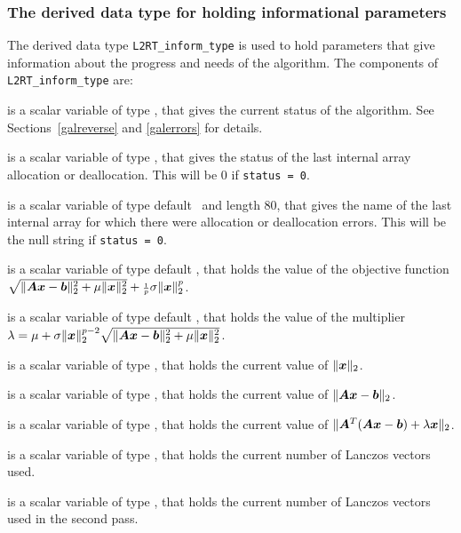 \documentclass{galahad}
\newcommand{\packagename}{L2\-RT}
\begin{document}

\subsubsection{The derived data type for holding informational
 parameters}\label{typeinform}
The derived data type
{\tt \packagename\_inform\_type}
is used to hold parameters that give information about the progress and needs
of the algorithm. The components of
{\tt \packagename\_inform\_type}
are:

\begin{description}
 is a scalar variable of type \integer, that gives the
current status of the algorithm. See Sections~\ref{galreverse} and
\ref{galerrors} for details.

 is a scalar variable of type \integer,
that gives the status of the last internal array allocation
or deallocation. This will be 0 if {\tt status = 0}.

 is a scalar variable of type default \character\
and length 80, that  gives the name of the last internal array
for which there were allocation or deallocation errors.
This will be the null string if {\tt status = 0}.

 is a scalar variable of type default
\realdp, that holds the value of the objective function
$\sqrt{\| {\bm{A}} {\bm{x}} - {\bm{b}}\|_2^2 + \mu \| {\bm{x}} \|_2^2}
 + {\scriptstyle \frac{1}{p}} \sigma \| {\bm{x}} \|_2^p$.

 is a scalar variable of type default
\realdp, that holds the value of the multiplier
$\lambda = \mu + \sigma \|{\bm{x}}\|_2^{p-2}
 \sqrt{\| {\bm{A}} {\bm{x}} - {\bm{b}} \|_2^2 + \mu \|{\bm{x}}\|_2^2}$.

 is a scalar variable of type \realdp,
that holds the current value of $\|{\bm{x}}\|_2$.

 is a scalar variable of type \realdp,
that holds the current value of
$\| {\bm{A}} {\bm{x}} - {\bm{b}} \|_2$.

 is a scalar variable of type \realdp,
that holds the current value of
$\|{\bm{A}}^T ( {\bm{A}} {\bm{x}} - \bm b ) + \lambda {\bm{x}} \|_2$.

 is a scalar variable of type \integer, that holds the
current number of Lanczos vectors used.

 is a scalar variable of type \integer, that holds the
current number of Lanczos vectors used in the second pass.

\end{description}
\end{document}
